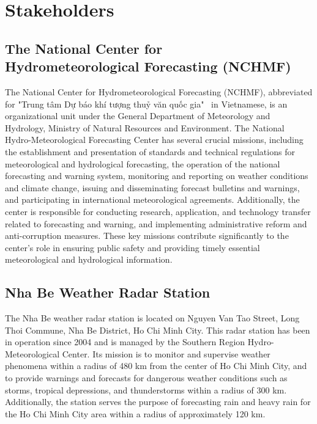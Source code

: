 \section{Stakeholders}

\subsection{The National Center for \\ Hydrometeorological Forecasting (NCHMF)}

The National Center for Hydrometeorological Forecasting (NCHMF), abbreviated for
"Trung tâm Dự báo khí tượng thuỷ văn quốc gia" \ in Vietnamese, is an
organizational unit under the General Department of Meteorology and Hydrology,
Ministry of Natural Resources and Environment\cite{NMHS}. The National
Hydro-Meteorological Forecasting Center has several crucial missions, including
the establishment and presentation of standards and technical regulations for
meteorological and hydrological forecasting, the operation of the national
forecasting and warning system, monitoring and reporting on weather conditions
and climate change, issuing and disseminating forecast bulletins and warnings,
and participating in international meteorological agreements. Additionally, the
center is responsible for conducting research, application, and technology
transfer related to forecasting and warning, and implementing administrative
reform and anti-corruption measures. These key missions contribute significantly
to the center's role in ensuring public safety and providing timely essential
meteorological and hydrological information.

\subsection{Nha Be Weather Radar Station}

The Nha Be weather radar station is located on Nguyen Van Tao Street, Long Thoi
Commune, Nha Be District, Ho Chi Minh City. This radar station has been in
operation since 2004 and is managed by the Southern Region Hydro-Meteorological
Center. Its mission is to monitor and supervise weather phenomena within a
radius of 480 km from the center of Ho Chi Minh City, and to provide warnings
and forecasts for dangerous weather conditions such as storms, tropical
depressions, and thunderstorms within a radius of 300 km. Additionally, the
station serves the purpose of forecasting rain and heavy rain for the Ho Chi
Minh City area within a radius of approximately 120 km.

